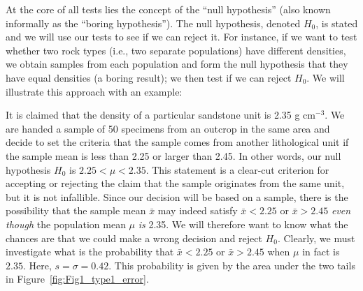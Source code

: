 	At the core of all tests lies the concept of the ``null hypothesis'' (also
known informally as the ``boring hypothesis'').  The null hypothesis,
denoted $H_0$, is stated and we will use our tests to see if we can reject it.  For instance, if 
we want to test whether two rock types (i.e., two separate populations) have different densities, we 
obtain samples from each population and form the null hypothesis 
that they have equal densities (a boring result); we then test if we can reject $H_0$.
We will illustrate this approach with an 
example:
\begin{example}
	It is claimed that the density of a particular sandstone unit is 
2.35 g cm$^{-3}$.  We are handed a sample 
of 50 specimens from an outcrop in the same area and decide to set the criteria that the sample 
comes from another lithological unit if the sample mean is less than 2.25 or larger than 2.45.  In other
words, our null hypothesis $H_0$ is $2.25 < \mu < 2.35$.  This statement is 
a clear-cut criterion for accepting or rejecting the claim that the sample originates from the same unit, 
but it is not infallible.  Since our decision will be based on a sample, there is the possibility that 
the sample mean $\bar{x}$ may indeed satisfy $\bar{x} < 2.25$ or $\bar{x} > 2.45$ \emph{even though} the
population mean $\mu$ \emph{is} 2.35.  We will 
therefore want to know what the chances are that we could make a wrong decision and reject $H_0$.
Clearly, we must investigate what is the probability that $\bar{x} < 2.25$ or $\bar{x} > 2.45$ when $\mu$ in fact is $2.35$.  
Here, $s = \sigma = 0.42$.  This probability is given by the area under the two tails in 
Figure~\ref{fig:Fig1_type1_error}.



\end{example}
